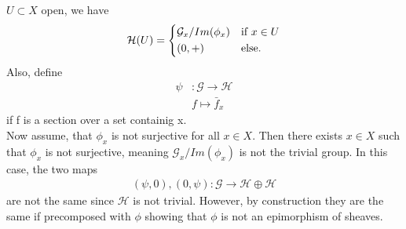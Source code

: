 \begin{exercise}{3}
\begin{enumerate}
    $U\subset X$ open, we have
    \begin{equation*}
        \mathcal{H}(U)=
        \begin{cases*}
            \mathcal{G}_x/Im(\phi_x) & \text{if} $x\in U$\\
            (0,+) & else.
        \end{cases*}
    \end{equation*}
    Also, define
    \begin{align*}
        \psi&:\mathcal{G}\to \mathcal{H}\\
            &f\mapsto \bar{f}_x
    \end{align*}
    if f is a section over a set containig x. \\
    Now assume, that $\phi_x$ is not surjective for all $x\in X$.
    Then there exists $x\in X$ such that $\phi_x$ is not surjective,
    meaning $\mathcal{G}_x/Im(\phi_x)$ is not the trivial group. 
    In this case, the two maps 
    \begin{align*}
        (\psi,0),(0,\psi):\mathcal{G}\to \mathcal{H} \oplus \mathcal{H}
    \end{align*}
    are not the same since $\mathcal{H}$ is not trivial. However,
     by construction they are the same if precomposed with $\phi$
     showing that $\phi$ is not an epimorphism of sheaves.
\end{enumerate}
\end{exercise}

